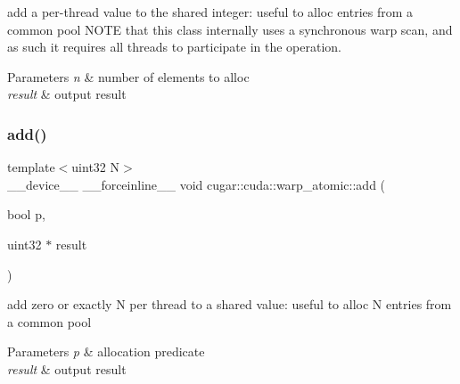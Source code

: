 add a per-\/thread value to the shared integer\+: useful to alloc entries from a common pool N\+O\+TE that this class internally uses a synchronous warp scan, and as such it requires all threads to participate in the operation.


\begin{DoxyParams}{Parameters}
{\em n} & number of elements to alloc \\
\hline
{\em result} & output result \\
\hline
\end{DoxyParams}
\mbox{\label{structcugar_1_1cuda_1_1warp__atomic_a3d7c404b15721514df19945f48272d37}} 
\subsubsection{\texorpdfstring{add()}{add()}\hspace{0.1cm}{\footnotesize\ttfamily [4/6]}}
{\footnotesize\ttfamily template$<$uint32 N$>$ \\
\+\_\+\+\_\+device\+\_\+\+\_\+ \+\_\+\+\_\+forceinline\+\_\+\+\_\+ void cugar\+::cuda\+::warp\+\_\+atomic\+::add (\begin{DoxyParamCaption}\item[{bool}]{p,  }\item[{uint32 $\ast$}]{result }\end{DoxyParamCaption})\hspace{0.3cm}{\ttfamily [inline]}}

add zero or exactly N per thread to a shared value\+: useful to alloc N entries from a common pool


\begin{DoxyParams}{Parameters}
{\em p} & allocation predicate \\
\hline
{\em result} & output result \\
\hline
\end{DoxyParams}
\mbox{\label{structcugar_1_1cuda_1_1warp__atomic_ab8efedd6b0ff805ea98e2c0f50954d96}} 
